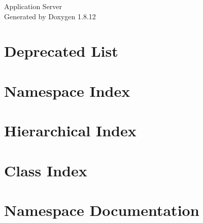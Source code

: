 \documentclass[twoside]{book}
\newcommand{\+}{\discretionary{\mbox{\scriptsize$\hookleftarrow$}}{}{}}
\newcommand{\clearemptydoublepage}{%
  \newpage{\pagestyle{empty}\cleardoublepage}%
}
\begin{document}
\hypersetup{pageanchor=false,
             bookmarksnumbered=true,
             pdfencoding=unicode
            }
\begin{titlepage}
\vspace*{7cm}
\begin{center}%
{\Large Application Server }\\
\vspace*{1cm}
{\large Generated by Doxygen 1.8.12}\\
\end{center}
\end{titlepage}
\clearemptydoublepage
{}
\tableofcontents
\clearemptydoublepage
{}
\hypersetup{pageanchor=true}

\chapter{Deprecated List}
\label{deprecated}
\hypertarget{deprecated}{}

\chapter{Namespace Index}

\chapter{Hierarchical Index}

\chapter{Class Index}

\chapter{Namespace Documentation}

\end{document}
